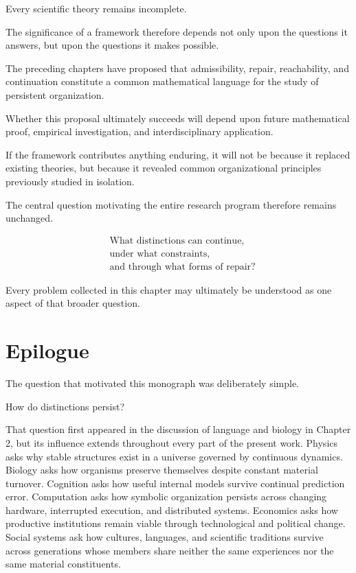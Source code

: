 \documentclass[11pt,oneside]{book}
\numberwithin{equation}{chapter}
\theoremstyle{definition}
\theoremstyle{plain}
\begin{document}
Every scientific theory remains incomplete.

The significance of a framework therefore depends not only upon the
questions it answers, but upon the questions it makes possible.

The preceding chapters have proposed that admissibility, repair,
reachability, and continuation constitute a common mathematical language
for the study of persistent organization.

Whether this proposal ultimately succeeds will depend upon future
mathematical proof, empirical investigation, and interdisciplinary
application.

If the framework contributes anything enduring, it will not be because it
replaced existing theories, but because it revealed common organizational
principles previously studied in isolation.

The central question motivating the entire research program therefore
remains unchanged.

\[
\boxed{
\begin{aligned}
&\text{What distinctions can continue,}\\
&\text{under what constraints,}\\
&\text{and through what forms of repair?}
\end{aligned}
}
\]

Every problem collected in this chapter may ultimately be understood as one
aspect of that broader question.

\chapter*{Epilogue}

The question that motivated this monograph was deliberately simple.

How do distinctions persist?

That question first appeared in the discussion of language and biology in
Chapter 2, but its influence extends throughout every part of the present
work. Physics asks why stable structures exist in a universe governed by
continuous dynamics. Biology asks how organisms preserve themselves despite
constant material turnover. Cognition asks how useful internal models
survive continual prediction error. Computation asks how symbolic
organization persists across changing hardware, interrupted execution, and
distributed systems. Economics asks how productive institutions remain
viable through technological and political change. Social systems ask how
cultures, languages, and scientific traditions survive across generations
whose members share neither the same experiences nor the same material
constituents.
\end{document}
